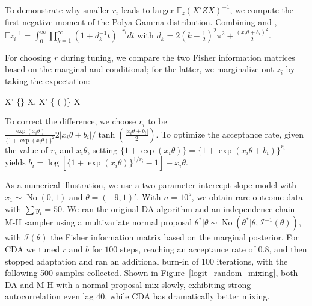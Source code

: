 \documentclass[10pt]{article}
\newcommand{\xtheta}{ x_i \theta}
\newcommand{\be}{\begin{equs}}
\newcommand{\ee}{\end{equs}}
\newcommand{\bb}[1]{\mathbb{#1}}
\newcommand{\mc}[1]{\mathcal{#1}}
\DeclareMathOperator{\No}{No}
\DeclareMathOperator{\diag}{diag}
\begin{document}
To demonstrate why smaller $r_i$ leads to larger $\bb E_z (X' Z X)^{-1}$, we compute the  first negative moment of the Polya-Gamma distribution. Combining \cite{cressie1981moment} and \cite{polson2013bayesian}, $\bb{E}z_i^{-1}= \int_0^{\infty} \prod_{k=1}^{\infty} (1+ d_k^{-1} t) ^{-r_i} dt$ with $d_k=2(k-\frac{1}{2})^2\pi^2 + \frac{(x_i\theta+b_i)^2}{2}$.

For choosing $r$ during tuning, we compare the two Fisher information matrices based on the marginal and conditional; for the latter, we marginalize out $z_i$ by taking the expectation:
\be
X' \diag\bigg\{\frac{\exp(\xtheta)}{ \{1+\exp(\xtheta)\} ^2}\bigg\} X, \quad X'  \diag\bigg\{ \frac{r_i}{2 |\xtheta+b_i|}\tanh\Big(\frac{|\xtheta+b_i|}{2} \Big)\bigg\} X
\ee
To correct the difference, we choose $r_i$ to be $\frac{\exp(\xtheta)}{ \{1+\exp(\xtheta)\} ^2} {2 |\xtheta+b_i|}/ \tanh(\frac{|\xtheta+b_i|}{2})$. To optimize the acceptance rate, given the value of $r_i$ and $\xtheta$,  setting $ \{1+\exp(\xtheta)\}  = \{1+\exp(\xtheta+b_i)\}^{r_i}  $ yields $b_i = \log[  \{1+\exp(\xtheta)\}^{1/r_i} -1] - \xtheta$.


As a numerical illustration, we use a two parameter intercept-slope model with $x_1\sim \No(0,1)$ and $\theta=(-9,1)'$. With $n= 10^5$, we obtain rare outcome data with 
 $\sum y_{i} = 50 $.  We ran the original DA algorithm  \citep{polson2013bayesian} and an independence chain M-H sampler using a multivariate normal proposal $\theta^*|\theta \sim \No(\theta^*| \theta, {\mc I}^{-1}(\theta))$, with ${\mc I}(\theta)$ the Fisher information matrix based on the marginal posterior. For CDA we tuned $r$ and $b$ for $100$ steps, reaching an acceptance rate of $0.8$, and then stopped adaptation and ran an additional burn-in of 100 iterations, with the following 500 samples collected.  Shown in Figure~\ref{logit_random_mixing}, both DA and M-H with a normal proposal mix slowly, exhibiting strong autocorrelation even lag $40$, while CDA has dramatically better mixing.
\end{document}
